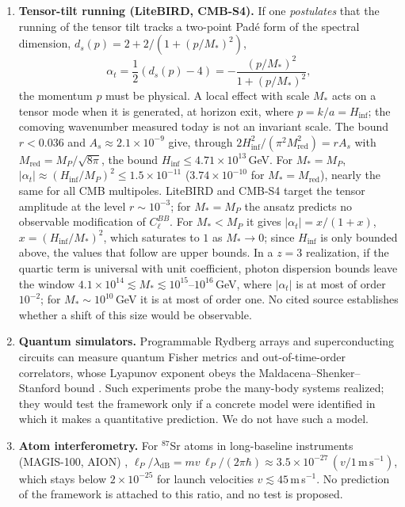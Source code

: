 \documentclass[11pt,a4paper,reqno]{amsart}
\theoremstyle{definition}
\numberwithin{equation}{section}
\begin{document}
\begin{enumerate}[label=(\roman*),leftmargin=1.8em]
    \item \textbf{Tensor-tilt running (LiteBIRD, CMB-S4).} If one \emph{postulates} that the running of the tensor tilt tracks a two-point Pad\'e form of the spectral dimension, $d_s(p) = 2 + 2/(1 + (p/M_\ast)^2)$,
    \begin{equation}
        \label{eq:tensor_running}
        \alpha_t = \frac{1}{2}\left(d_s(p) - 4\right) = -\frac{(p/M_\ast)^2}{1 + (p/M_\ast)^2},
    \end{equation}
    the momentum $p$ must be physical. A local effect with scale $M_\ast$ acts on a tensor mode when it is generated, at horizon exit, where $p = k/a = H_{\mathrm{inf}}$; the comoving wavenumber measured today is not an invariant scale. The bound $r < 0.036$ \cite{bicepkeck2021constraints} and $A_s \approx 2.1 \times 10^{-9}$ \cite{planck2018parameters} give, through $2H_{\mathrm{inf}}^2/(\pi^2 M_{\mathrm{red}}^2) = rA_s$ with $M_{\mathrm{red}} = M_P/\sqrt{8\pi}$, the bound $H_{\mathrm{inf}} \le 4.71 \times 10^{13}$\,GeV. For $M_\ast = M_P$, $|\alpha_t| \approx (H_{\mathrm{inf}}/M_P)^2 \le 1.5 \times 10^{-11}$ ($3.74 \times 10^{-10}$ for $M_\ast = M_{\mathrm{red}}$), nearly the same for all CMB multipoles. LiteBIRD \cite{litebird2023probing} and CMB-S4 target the tensor amplitude at the level $r \sim 10^{-3}$; for $M_\ast = M_P$ the ansatz predicts no observable modification of $C_\ell^{BB}$. For $M_\ast < M_P$ it gives $|\alpha_t| = x/(1+x)$, $x = (H_{\mathrm{inf}}/M_\ast)^2$, which saturates to $1$ as $M_\ast \to 0$; since $H_{\mathrm{inf}}$ is only bounded above, the values that follow are upper bounds. In a $z = 3$ realization, if the quartic term is universal with unit coefficient, photon dispersion bounds leave the window $4.1\times10^{14} \lesssim M_\ast \lesssim 10^{15}$--$10^{16}$\,GeV, where $|\alpha_t|$ is at most of order $10^{-2}$; for $M_\ast \sim 10^{10}$\,GeV it is at most of order one. No cited source establishes whether a shift of this size would be observable.

    \item \textbf{Quantum simulators.} Programmable Rydberg arrays \cite{ebadi2021quantum} and superconducting circuits can measure quantum Fisher metrics and out-of-time-order correlators, whose Lyapunov exponent obeys the Maldacena--Shenker--Stanford bound \cite{maldacena2016bound}. Such experiments probe the many-body systems realized; they would test the framework only if a concrete model were identified in which it makes a quantitative prediction. We do not have such a model.

    \item \textbf{Atom interferometry.} For $^{87}$Sr atoms in long-baseline instruments (MAGIS-100, AION) \cite{abe2021matter, badurina2020aion}, $\ell_P/\lambda_{\mathrm{dB}} = m v\, \ell_P/(2\pi\hbar) \approx 3.5 \times 10^{-27}\,(v/1\,\mathrm{m\,s^{-1}})$, which stays below $2 \times 10^{-25}$ for launch velocities $v \lesssim 45$\,m\,s$^{-1}$. No prediction of the framework is attached to this ratio, and no test is proposed.
\end{enumerate}
\end{document}
